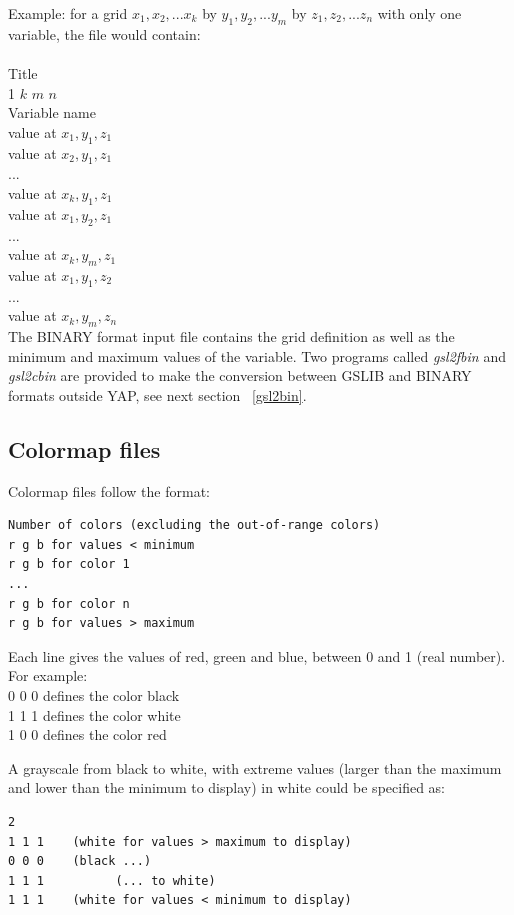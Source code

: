 Example: for a grid $x_1, x_2,... x_k$ by $y_1, y_2,... y_m$ by
$z_1, z_2,... z_n$ with only one variable, the file would contain: \\
\\
Title \\
1 $k$ $m$ $n$ \\
Variable name \\
value at $x_1, y_1, z_1$ \\
value at $x_2, y_1, z_1$ \\
... \\
value at $x_k, y_1, z_1$ \\
value at $x_1, y_2, z_1$ \\
... \\
value at $x_k, y_m, z_1$ \\
value at $x_1, y_1, z_2$ \\
... \\
value at $x_k, y_m, z_n$ \\

The BINARY format input file contains the grid definition as well
as the minimum and maximum values of the variable. Two programs called
{\em gsl2fbin} and {\em gsl2cbin} are provided to make the conversion between
GSLIB and BINARY formats outside YAP, see next section ~\ref{gsl2bin}.

\clearpage
\subsection{Colormap files}

Colormap files follow the format:

\begin{verbatim}
Number of colors (excluding the out-of-range colors)
r g b for values < minimum
r g b for color 1
...
r g b for color n
r g b for values > maximum
\end{verbatim}

Each line gives the values of red, green and blue, between 0 and 1 (real
number). For example: \\
0 0 0 defines the color black \\
1 1 1 defines the color white \\
1 0 0 defines the color red

A grayscale from black to white, with extreme values (larger than the maximum
and lower than the minimum to display) in white could be specified as:

\begin{verbatim}
2
1 1 1    (white for values > maximum to display)
0 0 0    (black ...)
1 1 1          (... to white)
1 1 1    (white for values < minimum to display)
\end{verbatim}

